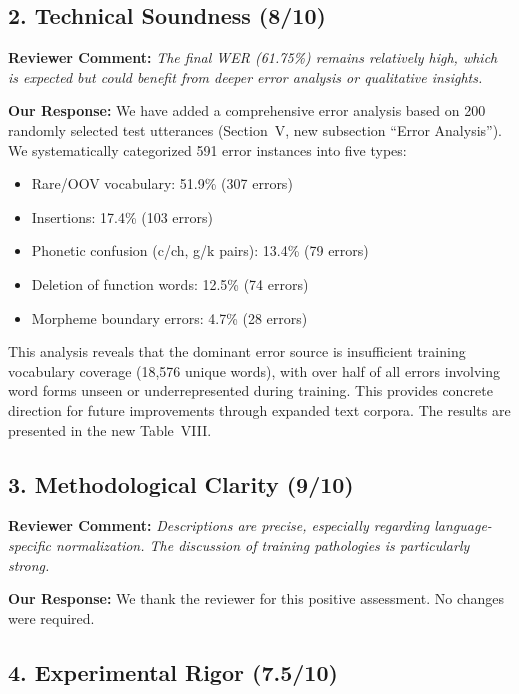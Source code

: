 \documentclass[11pt]{article}
\newcommand{\reviewercomment}[1]{\textcolor{reviewercolor}{\textbf{Reviewer Comment:} \textit{#1}}}
\newcommand{\response}[1]{\textcolor{responsecolor}{\textbf{Our Response:} #1}}
\begin{document}
\vspace{1em}

\subsection*{2. Technical Soundness (8/10)}

\reviewercomment{The final WER (61.75\%) remains relatively high, which is expected but could benefit from deeper error analysis or qualitative insights.}

\response{We have added a comprehensive error analysis based on 200 randomly selected test utterances (Section~V, new subsection ``Error Analysis''). We systematically categorized 591 error instances into five types:}

\begin{itemize}[noitemsep]
    \item Rare/OOV vocabulary: 51.9\% (307 errors)
    \item Insertions: 17.4\% (103 errors)
    \item Phonetic confusion (c/ch, g/k pairs): 13.4\% (79 errors)
    \item Deletion of function words: 12.5\% (74 errors)
    \item Morpheme boundary errors: 4.7\% (28 errors)
\end{itemize}

\noindent This analysis reveals that the dominant error source is insufficient training vocabulary coverage (18,576 unique words), with over half of all errors involving word forms unseen or underrepresented during training. This provides concrete direction for future improvements through expanded text corpora. The results are presented in the new Table~VIII.

\vspace{1em}

\subsection*{3. Methodological Clarity (9/10)}

\reviewercomment{Descriptions are precise, especially regarding language-specific normalization. The discussion of training pathologies is particularly strong.}

\response{We thank the reviewer for this positive assessment. No changes were required.}

\vspace{1em}

\subsection*{4. Experimental Rigor (7.5/10)}
\end{document}
